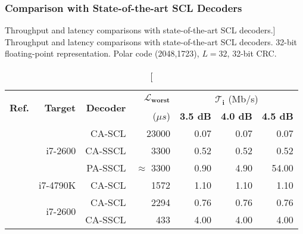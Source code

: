 \subsubsection{Comparison with State-of-the-art SCL Decoders}

\begin{table}[htp]
  \centering
  \caption
    [Throughput and latency comparisons with state-of-the-art SCL decoders.]
    {Throughput and latency comparisons with state-of-the-art SCL decoders.
    32-bit floating-point representation. Polar code (2048,1723), $L = 32$,
    32-bit CRC.}
  \label{tab:eval_polar_scl_perfs_comparison}
  \begin{tabular}{r r r r r r r}
    \multirow{2}{*}{\textbf{Ref.}}        & \multirow{2}{*}{\textbf{Target}} & \multirow{2}{*}{\textbf{Decoder}} & \multirow{1}{*}{\textbf{$\bm{\mathcal{L}_\text{worst}}$}} & \multicolumn{3}{c}{$\bm{\mathcal{T}_i}$ (Mb/s)} \\
    \cline{5-7}
                                          &                                  &                                   & ($\mu s$)                         & \textbf{3.5 dB} & \textbf{4.0 dB} & \textbf{4.5 dB} \\
    \hline
    \hline
    \multirow{3}{*}{\cite{Sarkis2014b}}   & \multirow{3}{*}{i7-2600}         & CA-SCL                            & 23000                             &  0.07           &  0.07           &   0.07          \\
                                          &                                  & CA-SSCL                           &  3300                             &  0.52           &  0.52           &   0.52          \\
                                          &                                  & PA-SSCL                           & $\approx$ 3300                    &  0.90           &  4.90           &  54.00          \\
    \hline
    \cite{Shen2016}                       & \multirow{1}{*}{i7-4790K}        & CA-SCL                            &  1572                             &  1.10           &  1.10           &   1.10          \\
    \hline
    \multirow{3}{*}{\cite{Sarkis2016}}    & \multirow{3}{*}{i7-2600}         & CA-SCL                            &  2294                             &  0.76           &  0.76           &   0.76          \\
                                          &                                  & CA-SSCL                           &   433                             &  4.00           &  4.00           &   4.00          \\

\end{tabular}
\end{table}
